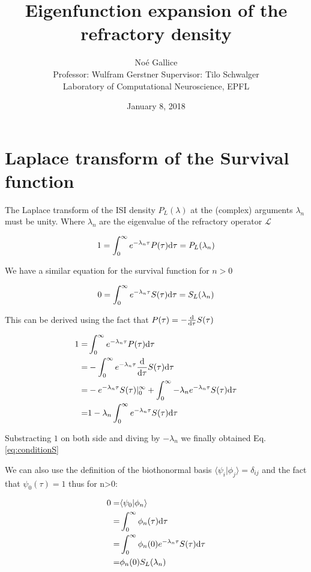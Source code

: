 \documentclass[a4paper,12pt,twoside]{article}
\title{Eigenfunction expansion of the refractory density}
\author{No\'e Gallice \\ Professor: Wulfram Gerstner \hspace{0.5cm}  Supervisor: Tilo Schwalger\\ \small{ Laboratory of Computational Neuroscience, EPFL }
}
\date{January 8, 2018}
\def \dd  {{\rm d}}
\begin{document}
\section{Laplace transform of the Survival function}

The Laplace transform of the ISI density $P_L(\lambda)$ at the (complex) arguments $\lambda_{n}$ must be unity. Where $\lambda_{n}$  are the eigenvalue of the refractory operator $\mathcal{L}$

\begin{equation}
\label{eq:conditionP}
1=\int_0^\infty e^{-\lambda_n \tau}P(\tau)\dd\tau=P_L(\lambda_n)\\
\end{equation}

We have a similar equation for the survival function for $n>0$

\begin{equation}
\label{eq:conditionS}
0=\int_0^\infty e^{-\lambda_n \tau}S(\tau)\dd\tau=S_L(\lambda_n)\\
\end{equation}

This can be derived using the fact that $P(\tau)=-\frac{\dd}{\dd \tau}S(\tau)$

\begin{eqnarray}
1=&\int_0^\infty e^{-\lambda_n \tau}P(\tau)\dd\tau\\
=&-\int_0^\infty e^{-\lambda_n \tau}\frac{\dd}{\dd \tau}S(\tau)\dd\tau \\
=& -e^{-\lambda_n \tau}S(\tau)|_0^\infty + \int_0^\infty -\lambda_ne^{-\lambda_n \tau}S(\tau)\dd\tau\\
=&1 -\lambda_n \int_0^\infty e^{-\lambda_n \tau}S(\tau)\dd\tau\\
\end{eqnarray}

Substracting $1$ on both side and diving by $ -\lambda_n$ we finally obtained Eq.\eqref{eq:conditionS}

We can also use the definition of the biothonormal basis $\langle\psi_i|\phi_j\rangle=\delta_{ij}$ and the fact that $\psi_0(\tau)=1$ thus for n>0:

\begin{eqnarray}
0=&\langle\psi_0|\phi_n\rangle\\
=&\int_0^\infty \phi_n(\tau) \dd\tau\\
=&\int_0^\infty \phi_n(0) e^{-\lambda_n \tau} S(\tau)\dd\tau\\
= &\phi_n(0) S_L(\lambda_n)
\end{eqnarray}
\end{document}
